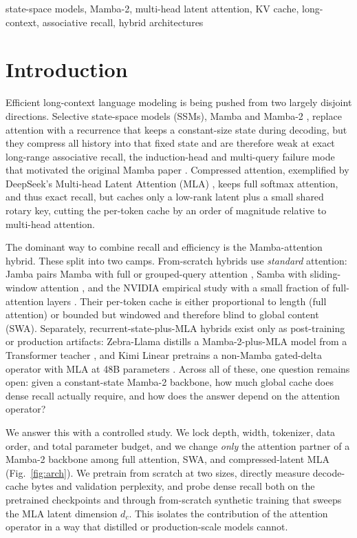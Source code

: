 \documentclass[conference]{IEEEtran}
\begin{document}
\begin{IEEEkeywords}
state-space models, Mamba-2, multi-head latent attention, KV cache, long-context, associative recall, hybrid architectures
\end{IEEEkeywords}

\section{Introduction}
Efficient long-context language modeling is being pushed from two largely disjoint directions. Selective state-space models (SSMs), Mamba and Mamba-2 \cite{mamba,mamba2}, replace attention with a recurrence that keeps a constant-size state during decoding, but they compress all history into that fixed state and are therefore weak at exact long-range associative recall, the induction-head and multi-query failure mode that motivated the original Mamba paper \cite{mamba,zoology}. Compressed attention, exemplified by DeepSeek's Multi-head Latent Attention (MLA) \cite{deepseekv2,deepseekv3}, keeps full softmax attention, and thus exact recall, but caches only a low-rank latent plus a small shared rotary key, cutting the per-token cache by an order of magnitude relative to multi-head attention.

The dominant way to combine recall and efficiency is the Mamba-attention hybrid. These split into two camps. From-scratch hybrids use \emph{standard} attention: Jamba pairs Mamba with full or grouped-query attention \cite{jamba}, Samba with sliding-window attention \cite{samba}, and the NVIDIA empirical study with a small fraction of full-attention layers \cite{nvidia}. Their per-token cache is either proportional to length (full attention) or bounded but windowed and therefore blind to global content (SWA). Separately, recurrent-state-plus-MLA hybrids exist only as post-training or production artifacts: Zebra-Llama distills a Mamba-2-plus-MLA model from a Transformer teacher \cite{zebrallama}, and Kimi Linear pretrains a non-Mamba gated-delta operator with MLA at 48B parameters \cite{kimilinear}. Across all of these, one question remains open: given a constant-state Mamba-2 backbone, how much global cache does dense recall actually require, and how does the answer depend on the attention operator?

We answer this with a controlled study. We lock depth, width, tokenizer, data order, and total parameter budget, and we change \emph{only} the attention partner of a Mamba-2 backbone among full attention, SWA, and compressed-latent MLA (Fig.~\ref{fig:arch}). We pretrain from scratch at two sizes, directly measure decode-cache bytes and validation perplexity, and probe dense recall both on the pretrained checkpoints and through from-scratch synthetic training that sweeps the MLA latent dimension $d_c$. This isolates the contribution of the attention operator in a way that distilled or production-scale models cannot.
\end{document}
